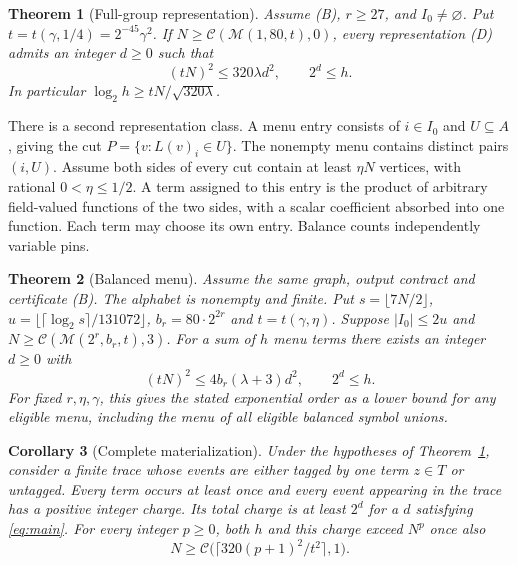 \documentclass[
  11pt,
]{article}
\newtheorem{theorem}{Theorem}
\newtheorem{corollary}[theorem]{Corollary}
\newcommand{\floor}[1]{\lfloor #1\rfloor}
\newcommand{\ceil}[1]{\lceil #1\rceil}
\begin{document}
\begin{theorem}[Full-group representation]\label{thm:full}
Assume (B), \(r\ge27\), and \(I_0\ne\varnothing\).
Put \(t=t(\gamma,1/4)=2^{-45}\gamma^2\).
If \(N\ge\mathcal C(\mathcal M(1,80,t),0)\), every representation
(D) admits an integer \(d\ge0\) such that
\begin{equation}\tag{D1}\label{eq:main}
      (tN)^2\le 320\lambda d^2,\qquad 2^d\le h .
\end{equation}
In particular \(\log_2 h\ge tN/\sqrt{320\lambda}\).
\end{theorem}

There is a second representation class. A menu entry consists of
\(i\in I_0\) and \(U\subseteq A\), giving the cut
\(P=\{v:L(v)_i\in U\}\). The nonempty menu contains distinct pairs
\((i,U)\). Assume both sides of every cut contain at least \(\eta N\)
vertices, with rational \(0<\eta\le1/2\). A term assigned to this entry is
the product of arbitrary field-valued functions of the two sides, with a
scalar coefficient absorbed into one function. Each term may choose
its own entry. Balance counts independently variable pins.

\begin{theorem}[Balanced menu]\label{thm:menu}
Assume the same graph, output contract and certificate (B). The alphabet is nonempty and finite. Put
\(s=\floor{7N/2}\), \(u=\floor{\ceil{\log_2 s}/131072}\),
\(b_r=80\cdot2^{2r}\) and \(t=t(\gamma,\eta)\). Suppose
\(|I_0|\le 2u\) and \(N\ge\mathcal C(\mathcal M(2^r,b_r,t),3)\).
For a sum of \(h\) menu terms there exists an integer \(d\ge0\) with
\[
      (tN)^2\le 4 b_r(\lambda+3)d^2,\qquad 2^d\le h .
\]
For fixed \(r,\eta,\gamma\), this gives the stated exponential order as
a lower bound for any eligible menu, including the menu of all eligible
balanced symbol unions.
\end{theorem}

\begin{corollary}[Complete materialization]\label{cor:cost}
Under the hypotheses of Theorem~\ref{thm:full}, consider a finite trace
whose events are either tagged by one term \(z\in T\) or untagged. Every
term occurs at least once and every event appearing in the trace has a
positive integer charge. Its total charge is at least \(2^d\) for a \(d\)
satisfying \eqref{eq:main}. For every integer \(p\ge0\), both \(h\) and this
charge exceed \(N^p\) once also
\[
     N\ge\mathcal C\bigl(\ceil{320(p+1)^2/t^2},1\bigr).
\]
\end{corollary}
\end{document}
